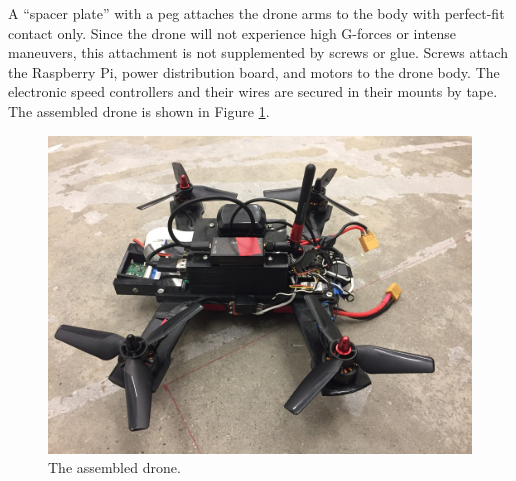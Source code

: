 A ``spacer plate'' with a peg attaches the drone arms to the body with perfect-fit contact only.
Since the drone will not experience high G-forces or intense maneuvers, this attachment is not supplemented by screws or glue.
Screws attach the Raspberry Pi, power distribution board, and motors to the drone body.
The electronic speed controllers and their wires are secured in their mounts by tape.
The assembled drone is shown in Figure \ref{figure:drone_assembled}.

\begin{figure}
    \centering
    \includegraphics[width=\columnwidth]{images/drone_assembled.jpg}
    \caption{The assembled drone.}
    \label{figure:drone_assembled}
\end{figure}